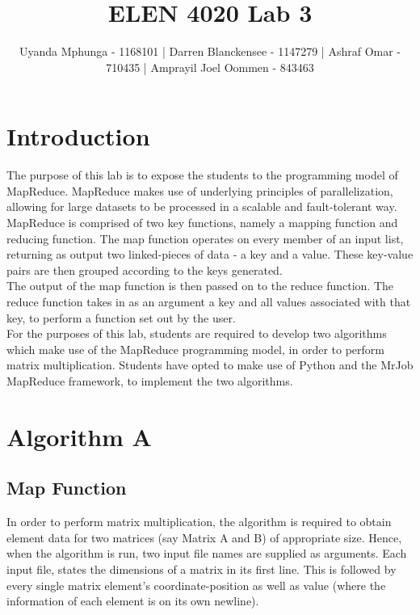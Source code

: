 \documentclass[journal, a4paper]{IEEEtran}
\begin{document}
	\title{ELEN 4020 Lab 3}

	\author{\small Uyanda Mphunga - 1168101 | Darren Blanckensee - 1147279 |
Ashraf Omar - 710435 | Amprayil Joel Oommen - 843463}

	\maketitle

\section{Introduction}
The purpose of this lab is to expose the students to the programming model of MapReduce. MapReduce makes use of underlying principles of parallelization, allowing for large datasets to be processed in a scalable and fault-tolerant way.\\

MapReduce is comprised of two key functions, namely a mapping function and reducing function. The map function operates on every member of an input list, returning as output two linked-pieces of data - a key and a value. These key-value pairs are then grouped according to the keys generated.\\

The output of the map function is then passed on to the reduce function. The reduce function takes in as an argument a key and all values associated with that key, to perform a function set out by the user.\\

For the purposes of this lab, students are required to develop two algorithms which make use of the MapReduce programming model, in order to perform matrix multiplication. Students have opted to make use of Python and the MrJob MapReduce framework, to implement the two algorithms. 

\section{Algorithm A}
\subsection{Map Function}
\noindent
In order to perform matrix multiplication, the algorithm is required to obtain element data for two matrices (say Matrix A and B) of appropriate size. Hence, when the algorithm is run, two input file names are supplied as arguments. Each input file, states the dimensions of a matrix in its first line. This is followed by every single matrix element's coordinate-position as well as value (where the information of each element is on its own newline).
\end{document}
